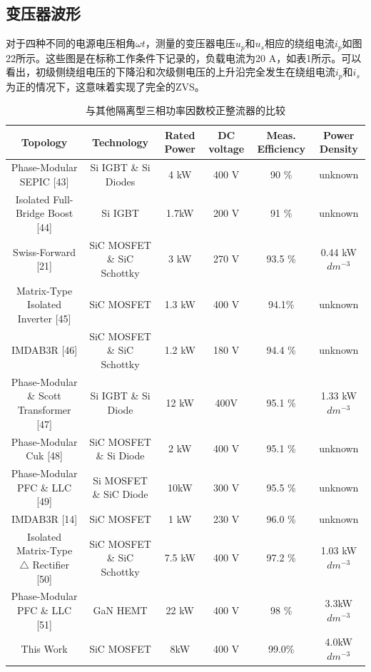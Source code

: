 \documentclass[journal]{IEEEtran}
\begin{document}
\subsection{变压器波形}

对于四种不同的电源电压相角$\omega t$，测量的变压器电压$u_p$和$u_s$相应的绕组电流$i_p$如图22所示。这些图是在标称工作条件下记录的，负载电流为20 A，如表1所示。可以看出，初级侧绕组电压的下降沿和次级侧电压的上升沿完全发生在绕组电流$i_p$和$i_s$为正的情况下，这意味着实现了完全的ZVS。


\begin{table}[h]
\caption{与其他隔离型三相功率因数校正整流器的比较}
\label{table2}
\centering
\begin{tabular}{cccccc}
\hline
Topology & Technology & Rated Power & DC voltage & Meas. Efficiency & Power Density \\
\hline
Phase-Modular SEPIC [43] & Si IGBT \& Si Diodes & 4 kW & 400 V & 90 \% & unknown \\
Isolated Full-Bridge Boost [44] & Si IGBT & 1.7kW & 200 V & 91 \% & unknown \\
Swiss-Forward [21] & SiC MOSFET \& SiC Schottky & 3 kW & 270 V & 93.5 \% & 0.44 kW $dm^{-3}$ \\
Matrix-Type Isolated Inverter [45] & SiC MOSFET & 1.3 kW & 400 V & 94.1\% & unknown \\
IMDAB3R [46] & SiC MOSFET \& SiC Schottky & 1.2 kW & 180 V & 94.4 \% & unknown \\
Phase-Modular \& Scott Transformer [47] & Si IGBT \& Si Diode & 12 kW & 400V & 95.1 \% & 1.33 kW $dm^{-3}$ \\
Phase-Modular Cuk [48] & SiC MOSFET \& Si Diode & 2 kW & 400 V & 95.1 \% & unknown \\
Phase-Modular PFC \& LLC [49] & Si MOSFET \& SiC Diode & 10kW & 300 V & 95.5 \% & unknown \\
IMDAB3R [14] & SiC MOSFET & 1 kW & 230 V & 96.0 \% & unknown\\
Isolated Matrix-Type $\triangle$ Rectifier [50] & SiC MOSFET \& SiC Schottky & 7.5 kW & 400 V & 97.2 \% & 1.03 kW $dm^{-3}$ \\
Phase-Modular PFC \& LLC [51] & GaN HEMT & 22 kW & 400 V & 98 \% & 3.3kW $dm^{-3}$ \\
\hline
This Work & SiC MOSFET & 8kW & 400 V & 99.0\% & 4.0kW $dm^{-3}$ \\
\hline
\end{tabular}
\end{table}

\end{document}
